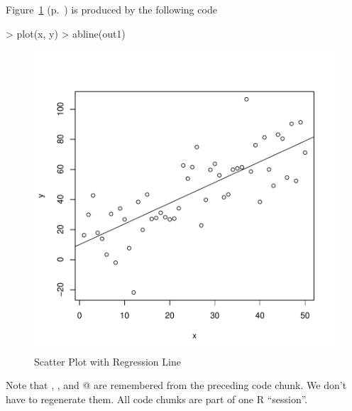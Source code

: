 \documentclass{article}
\begin{document}
Figure~\ref{fig:one} (p.~\pageref{fig:one})
is produced by the following code
\begin{Schunk}
\begin{Sinput}
> plot(x, y)
> abline(out1)
\end{Sinput}
\end{Schunk}
\begin{figure}
\begin{center}
\includegraphics{report-fig1}
\end{center}
\caption{Scatter Plot with Regression Line}
\label{fig:one}
\end{figure}
Note that \verb@x@, \verb@y@, and @ are remembered from
the preceding code chunk.  We don't have to regenerate them.
All code chunks are part of one R ``session''.
\end{document}
